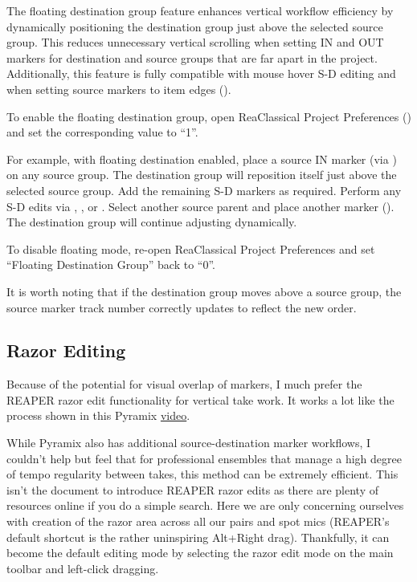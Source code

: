 \documentclass[10pt,american]{article}
\begin{document}
The floating destination group feature enhances vertical workflow efficiency by
dynamically positioning the destination group just above the selected source
group. This reduces unnecessary vertical scrolling when setting IN and OUT
markers for destination and source groups that are far apart in the project.
Additionally, this feature is fully compatible with mouse hover S-D editing and
when setting source markers to item edges ().

To enable the floating destination group, open ReaClassical Project Preferences
() and set the corresponding value to ``1''.

For example, with floating destination enabled, place a source IN marker (via
) on any source group. The destination group will reposition itself just
above the selected source group. Add the remaining S-D markers as required.
Perform any S-D edits via , , or . Select another
source parent and place another marker (). The destination group will
continue adjusting dynamically. 

To disable floating mode, re-open ReaClassical Project Preferences and set
``Floating Destination Group'' back to ``0''.

It is worth noting that if the destination group moves above a source group, the
source marker track number correctly updates to reflect the new order. 

\subsection{Razor Editing}

Because of the potential for visual overlap of markers, I much prefer the REAPER
razor edit functionality for vertical take work. It works a lot like the process
shown in this Pyramix \href{https://www.youtube.com/watch?v=wQXwnvITQCQ}{video}.

While Pyramix also has additional source-destination marker workflows, I
couldn't help but feel that for professional ensembles that manage a high degree
of tempo regularity between takes, this method can be extremely efficient. This
isn't the document to introduce REAPER razor edits as there are plenty of
resources online if you do a simple search. Here we are only concerning
ourselves with creation of the razor area across all our pairs and spot mics
(REAPER's default shortcut is the rather uninspiring Alt+Right drag).
Thankfully, it can become the default editing mode by selecting the razor edit
mode on the main toolbar and left-click dragging. 
\end{document}
